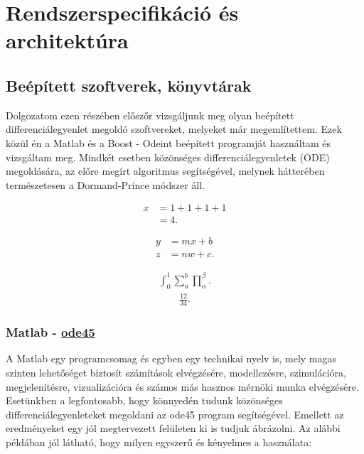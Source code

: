 \chapter{Rendszerspecifikáció és architektúra} \label{fejezet3}

\section {Beépített szoftverek, könyvtárak}

Dolgozatom ezen részében előszőr vizsgáljunk meg olyan beépített differenciálegyenlet megoldó szoftvereket, melyeket már megemlítettem. Ezek közül én a Matlab és a Boost - Odeint beépített programját használtam és vizsgáltam meg. Mindkét esetben közönséges differenciálegyenletek (ODE) megoldására, az előre megírt algoritmus segítségével, melynek hátterében természetesen a Dormand-Prince módszer áll.


	\begin{align}
	x&=1+1+1+1\\
	&=4.
\end{align}

	\begin{align}
	y&=mx+b\nonumber\\
	z&=nw+c.
\end{align}

			\begin{align}
	\int_0^1\sum_a^b\prod_\alpha^\beta.
\end{align}
	\begin{align*}
	\frac{12}{34}.
\end{align*}
\subsection {Matlab - \href{https://www.mathworks.com/help/matlab/ref/ode45.html}{ode45}} \label{MatlabOde45}

A Matlab egy programcsomag és egyben egy technikai nyelv is, mely magas szinten lehetőséget biztosít számítások elvégzésére, modellezésre, szimulációra, megjelenítésre, vizualizációra és számos más hasznos mérnöki munka elvégzésére. Esetünkben a legfontosabb, hogy könnyedén tudunk közönséges differenciálegyenleteket megoldani az ode45 program segítségével. Emellett az eredményeket egy jól megtervezett felületen ki is tudjuk ábrázolni. Az alábbi példában jól látható, hogy milyen egyszerű és kényelmes a használata:

